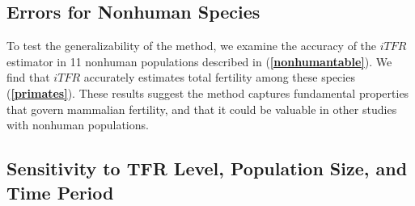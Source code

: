 \documentclass[12pt]{article}
\begin{document}
\hypertarget{errors-for-nonhuman-species}{%
\subsection{Errors for Nonhuman
Species}\label{errors-for-nonhuman-species}}

To test the generalizability of the method, we examine the accuracy of
the \(iTFR\) estimator in 11 nonhuman populations described in
(\textbf{\autoref{nonhumantable}}). We find that \(iTFR\) accurately
estimates total fertility among these species
(\textbf{\autoref{primates}}). These results suggest the method captures
fundamental properties that govern mammalian fertility, and that it
could be valuable in other studies with nonhuman populations.

\hypertarget{sensitivity-to-tfr-level-population-size-and-time-period}{%
\subsection{Sensitivity to TFR Level, Population Size, and Time
Period}\label{sensitivity-to-tfr-level-population-size-and-time-period}}
\end{document}
